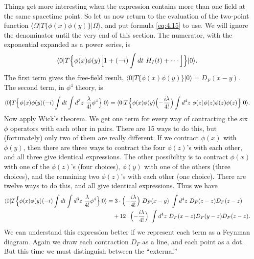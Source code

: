 Things get more interesting when the expression contains more than one field
at the same spacetime point.  So let us now return to the evaluation of the
two-point function $\langle\Omega|T\{\phi(x)\phi(y)\}|\Omega\rangle$, and put
formula \eqref{eq:4.15} to use.  We will ignore the denominator until the
very end of this section.  The numerator, with the exponential expanded as a
power series, is
\begin{equation}
  \langle 0|T\Bigl\{ \phi(x)\phi(y)
    \Bigl[ 1 + (-i)\int dt\ H_I(t) + \cdots \Bigr] \Bigr\}|0\rangle .
  \label{eq:4.43}
\end{equation}
The first term gives the free-field result,
$\langle 0|T\{\phi(x)\phi(y)\}|0\rangle = D_F(x-y)$.  The second term, in
$\phi^4$ theory, is
\begin{equation}
  \langle 0|T\Bigl\{ \phi(x)\phi(y)(-i)\int dt\int d^3z\
    \frac{\lambda}{4!}\phi^4 \Bigr\}|0\rangle
  = \langle 0|T\Bigl\{ \phi(x)\phi(y)
    \Bigl( -\frac{i\lambda}{4!} \Bigr)\int d^4z\
      \phi(z)\phi(z)\phi(z)\phi(z) \Bigr\}|0\rangle .
\end{equation}
Now apply Wick's theorem.  We get one term for every way of contracting the
six $\phi$ operators with each other in pairs.  There are 15 ways to do this,
but (fortunately) only two of them are really different.  If we contract
$\phi(x)$ with $\phi(y)$, then there are three ways to contract the four
$\phi(z)$'s with each other, and all three give identical expressions.  The
other possibility is to contract $\phi(x)$ with one of the $\phi(z)$'s (four
choices), $\phi(y)$ with one of the others (three choices), and the remaining
two $\phi(z)$'s with each other (one choice).  There are twelve ways to do
this, and all give identical expressions.  Thus we have
\begin{equation}
  \begin{aligned}
    \langle 0|T\Bigl\{ \phi(x)\phi(y)(-i)\int dt\int d^3z\
      \frac{\lambda}{4!}\phi^4 \Bigr\}|0\rangle
    &= 3\cdot\Bigl( -\frac{i\lambda}{4!} \Bigr)\ D_F(x-y)\
      \int d^4z\ D_F(z-z)D_F(z-z)\\
    &\quad + 12\cdot\Bigl( -\frac{i\lambda}{4!} \Bigr)\
      \int d^4z\ D_F(x-z)D_F(y-z)D_F(z-z) .
  \end{aligned}
  \label{eq:4.44}
\end{equation}
We can understand this expression better if we represent each term as a
Feynman diagram.  Again we draw each contraction $D_F$ as a line, and each
point as a dot.  But this time we must distinguish between the ``external''
